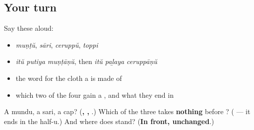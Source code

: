 \subsection*{Your turn}
Say these aloud:

\begin{itemize}
\raggedright
  \item \emph{muṇṭŭ}, \emph{sāri}, \emph{ceruppŭ}, \emph{toppi}
  \item \emph{itŭ putiya muṇṭāṇŭ}, then \emph{itŭ paḻaya ceruppāṇŭ}
  \item the word for the cloth a \textbf{} is made of
  \item which two of the four gain a \textbf{}, and what they end in
\end{itemize}

\begin{tcolorbox}[breakable,colback=teal!4,colframe=teal!35!black,title={Before you move on}]
A mundu, a sari, a cap? (\textbf{, , }.) Which of the three takes \textbf{nothing} before \textbf{}? (\textbf{} — it ends in the half-u.) And where does \textbf{} stand? (\textbf{In front, unchanged}.)
\end{tcolorbox}
